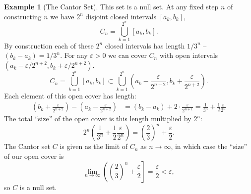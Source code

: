 \documentclass{article}
\theoremstyle{definition}
\newtheorem{example}{Example}[section]
\begin{document}
\begin{example}[The Cantor Set]
		This set is a null set. At any fixed step $ n$ of constructing $ n $ we have $ 2^n $ disjoint closed intervals $ [a_k,b_k] ,$ 
		$$ C_n = \bigcup_{k=1}^{2^n}[a_k,b_k] .$$ By construction each of these $ 2^n $ closed intervals has length $ 1/3^n $ -- $ (b_k-a_k)=1/3^n $. For any $ \varepsilon > 0 $ we can cover $ C_n $ with open intervals $ (a_k-\varepsilon/2^{n+2}, b_k+\varepsilon/2^{n+2})  $.
		$$ C_n = \bigcup_{k=1}^{2^n}[a_k,b_k]\subset \bigcup_{k=1}^{2^n}\left(a_k-\frac{\varepsilon}{2^{n+2}},b_k+\frac{\varepsilon}{2^{n+2}}\right) .$$ Each element of this open cover has length: 
		\begin{align*}
			\left( b_k+\frac{\varepsilon}{2^{n+2}} \right)- \left(a_k-\frac{\varepsilon}{2^{n+2}}\right) & = (b_k-a_k) + 2\cdot \frac{\varepsilon}{2^{n+1}} = \frac{1}{3^n}+\frac{1}{2}\frac{\varepsilon}{2^n}
		\end{align*}
		The total ``size'' of the open cover is this length multiplied by $ 2^n $: 
		$$ 2^n\left(\frac{1}{3^n}+\frac{1}{2}\frac{\varepsilon}{2^n}\right) = \left(\frac{2}{3}\right)^n + \frac{\varepsilon}{2}.$$
		The Cantor set $ C $ is given as the limit of $ C_n $ as $ n\to\infty $, in which case the ``size'' of our open cover is 
		$$  \lim\limits_{n\to\infty}\left( \left(\frac{2}{3}\right)^n + \frac{\varepsilon}{2}\right] = \frac{\varepsilon}{2} < \varepsilon,$$ so $ C $ is a null set. 
		

\end{example}
\end{document}
